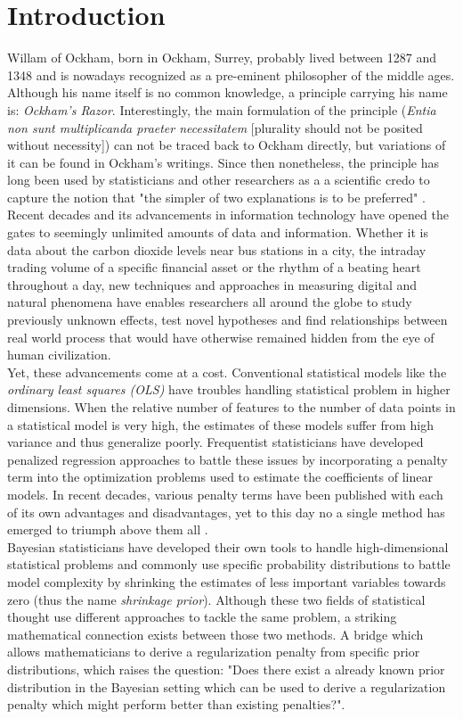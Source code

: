 \documentclass[12pt,a4paper]{article}
\begin{document}
\section{Introduction}
Willam of Ockham, born in Ockham, Surrey, probably lived between 1287 and 1348 and is nowadays recognized as a pre-eminent philosopher of the middle ages. Although     his name itself is no common knowledge, a principle carrying his name is: \textit{Ockham's Razor}. Interestingly, the main formulation of the principle (\textit{Entia non sunt multiplicanda praeter necessitatem} [plurality should not be posited without necessity]) can not be traced back to Ockham directly, but variations of it can be found in Ockham's writings. Since then nonetheless, the principle has long been used by statisticians and other researchers as a a scientific credo to capture the notion that "the simpler of two explanations is to be preferred" \parencite{Lazar2010}. Recent decades and its advancements in information technology have opened the gates to seemingly unlimited amounts of data and information. Whether it is data about the carbon dioxide levels near bus stations in a city, the intraday trading volume of a specific financial asset or the rhythm of a beating heart throughout a day, new techniques and approaches in measuring digital and natural phenomena have enables researchers all around the globe to study previously unknown effects, test novel hypotheses and find relationships between real world process that would have otherwise remained hidden from the eye of human civilization.\\

Yet, these advancements come at a cost. Conventional statistical models like the \textit{ordinary least squares (OLS)} have troubles handling statistical problem in higher dimensions. When the relative number of features to the number of data points in a statistical model is very high, the estimates of these models suffer from high variance and thus generalize poorly. Frequentist statisticians have developed penalized regression approaches to battle these issues by incorporating a penalty term into the optimization problems used to estimate the coefficients of linear models. In recent decades, various penalty terms have been published with each of its own advantages and disadvantages, yet to this day no a single method has emerged to triumph above them all \parencite{WangEtAl2020}.\\

Bayesian statisticians have developed their own tools to handle high-dimensional statistical problems and commonly use specific probability distributions to battle model complexity by shrinking the estimates of less important variables towards zero (thus the name \textit{shrinkage prior}). Although these two fields of statistical thought use different approaches to tackle the same problem, a striking mathematical connection exists between those two methods. A bridge which allows mathematicians to derive a regularization penalty from specific prior distributions, which raises the question: "Does there exist a already known prior distribution in the Bayesian setting which can be used to derive a regularization penalty which might perform better than existing penalties?".\\
\end{document}
